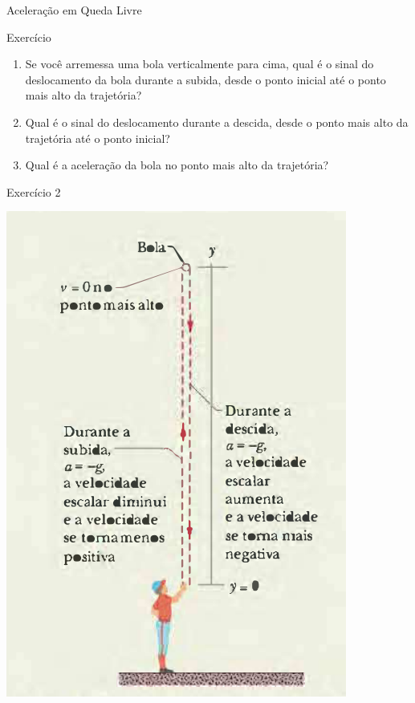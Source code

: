 \documentclass[xcolor=dvipsnames,table]{beamer}
\begin{document}
	\begin{frame}{Aceleração em Queda Livre}
		\begin{block}{Exercício}
			\begin{enumerate}
				\item Se você arremessa uma bola verticalmente para cima, qual é o sinal do deslocamento da bola durante a subida, desde o ponto inicial até o ponto mais alto da trajetória? \pause
				\item Qual é  o sinal do deslocamento durante a descida, desde o ponto mais alto da trajetória até o ponto inicial? \pause
				\item Qual é a aceleração da bola no ponto mais alto da trajetória?
			\end{enumerate}
		\end{block}
	\end{frame}

	\begin{frame}{Exercício 2}
		\begin{center}
			\includegraphics[scale=0.45]{images/fig2-11}
		\end{center}
	\end{frame}
\end{document}
